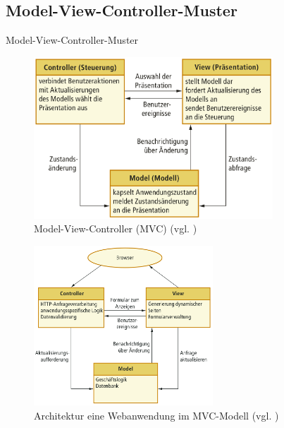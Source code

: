 \documentclass{beamer}
\begin{document}
			\subsection{Model-View-Controller-Muster}
			\begin{frame}[allowframebreaks]{Model-View-Controller-Muster}
			   	\begin{figure}
					\includegraphics[width=0.8\textwidth]{mvc.png}
					\caption{Model-View-Controller (MVC) (vgl. \cite[ S.193]{sommer})}
				\end{figure}
				\begin{figure}
					\includegraphics[width=0.6\textwidth]{mvc_bsp.png}
					\caption{Architektur eine Webanwendung im MVC-Modell (vgl. \cite[ S.193]{sommer})}
				\end{figure}
			\end{frame}
\end{document}
